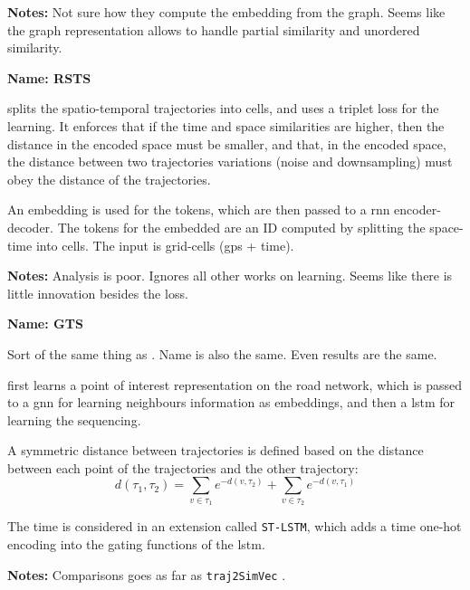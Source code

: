 \textbf{Notes:} Not sure how they compute the embedding from the graph. Seems like the graph representation allows to handle partial similarity and unordered similarity.


\textbf{Name: RSTS} 

\cite{chen2022towards} splits the spatio-temporal trajectories into cells, and uses a triplet loss for the learning.
%
It enforces that if the time and space similarities are higher, then the distance in the encoded space must be smaller, and that, in the encoded space, the distance between two trajectories variations (noise and downsampling) must obey the distance of the trajectories.

An embedding is used for the tokens, which are then passed to a \gls{rnn} encoder-decoder. The tokens for the embedded are an ID computed by splitting the space-time into cells. The input is grid-cells (gps + time).

\textbf{Notes:} Analysis is poor. Ignores all other works on learning. Seems like there is little innovation besides the loss.



\textbf{Name: GTS}

Sort of the same thing as \cite{han2021graph}. Name is also the same. Even results are the same.

\cite{zhou2023spatial} first learns a point of interest representation on the road network, which is passed to a \gls{gnn} for learning neighbours information as embeddings, and then a \gls{lstm} for learning the sequencing.

A symmetric distance  between trajectories is defined based on the distance between each point of the trajectories and the other trajectory:
$$
d(\tau_1, \tau_2) = \sum_{v\in\tau_1}e^{-d(v, \tau_2)} + \sum_{v\in\tau_2}e^{-d(v, \tau_1)}
$$

The time is considered in an extension called \texttt{ST-LSTM}, which adds a time one-hot encoding into the gating functions of the \gls{lstm}.

\textbf{Notes:} Comparisons goes as far as \texttt{traj2SimVec} \cite{zhang2020trajectory}.


